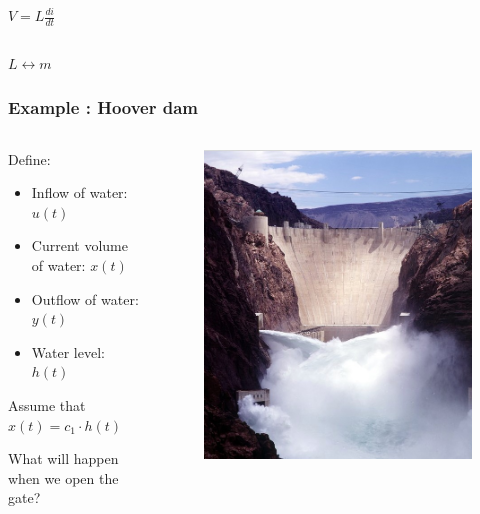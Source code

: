 \begin{frame}
\begin{columns}
		\begin{column}{0.25\linewidth}
			\hspace{3pt}
			$V = L\frac{di}{dt}$
		\end{column}
		
	\end{columns}
	
	\begin{center}
		$\boxed{L \leftrightarrow m} $	
	\end{center}
\end{frame}

\begin{frame}
	\frametitle{Example : Hoover dam}
	\begin{columns}
		\begin{column}{0.6\linewidth}
			Define:
			\begin{itemize}
				\item Inflow of water: $u(t)$
				\item Current volume of water: $x(t)$
				\item Outflow of water: $y(t)$
				\item Water level: $h(t)$
			\end{itemize}
			Assume that $x(t) = c_1\cdot h(t)$
			
			\vspace{6pt}
			What will happen when we open the gate?
		\end{column}
		\begin{column}{0.4\linewidth}
			\begin{figure}
				\centering
				\includegraphics[width=1\linewidth]{img/Hoover-dam}
				\label{fig:Hoover-dam}
			\end{figure}
		\end{column}
	\end{columns}
	

\end{frame}
